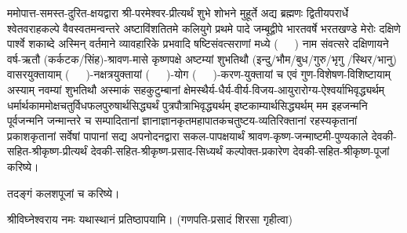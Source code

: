 ममोपात्त-समस्त-दुरित-क्षयद्वारा श्री-परमेश्वर-प्रीत्यर्थं शुभे शोभने मुहूर्ते अद्य ब्रह्मणः
द्वितीयपरार्धे श्वेतवराहकल्पे वैवस्वतमन्वन्तरे अष्टाविंशतितमे कलियुगे प्रथमे पादे
जम्बूद्वीपे भारतवर्षे भरतखण्डे मेरोः दक्षिणे पार्श्वे शकाब्दे अस्मिन् वर्तमाने व्यावहारिके
प्रभवादि षष्टिसंवत्सराणां मध्ये \mbox{(~~~)} नाम संवत्सरे दक्षिणायने वर्ष-ऋतौ  (कर्कटक/सिंह)-श्रावण-मासे 
कृष्णपक्षे अष्टम्यां शुभतिथौ (इन्दु/भौम/बुध/गुरु/भृगु /स्थिर/भानु) वासरयुक्तायाम्
\mbox{(~~~)}-नक्षत्रयुक्तायां \mbox{(~~~)}-योग \mbox{(~~~)}-करण-युक्तायां च एवं गुण-विशेषण-विशिष्टायाम्
अस्याम् नवम्यां शुभतिथौ अस्माकं सहकुटुम्बानां क्षेमस्थैर्य-धैर्य-वीर्य-विजय-आयुरारोग्य-ऐश्वर्याभिवृद्ध्यर्थम्
धर्मार्थकाममोक्ष\-चतुर्विधफलपुरुषार्थसिद्ध्यर्थं पुत्रपौत्राभिवृद्ध्यर्थम् इष्टकाम्यार्थसिद्ध्यर्थम्
मम इहजन्मनि पूर्वजन्मनि जन्मान्तरे च सम्पादितानां ज्ञानाज्ञानकृतमहा\-पातकचतुष्टय-व्यतिरिक्तानां रहस्यकृतानां प्रकाशकृतानां सर्वेषां पापानां सद्य अपनोदनद्वारा सकल-पापक्षयार्थं 
श्रावण-कृष्ण-जन्माष्टमी-पुण्यकाले देवकी-सहित-श्रीकृष्ण-प्रीत्यर्थं देवकी-सहित-श्रीकृष्ण-प्रसाद-सिध्यर्थं कल्पोक्त-प्रकारेण देवकी-सहित-श्रीकृष्ण-पूजां करिष्ये।

तदङ्गं कलशपूजां च करिष्ये।


श्रीविघ्नेश्वराय नमः यथास्थानं प्रतिष्ठापयामि।
(गणपति-प्रसादं शिरसा गृहीत्वा)














